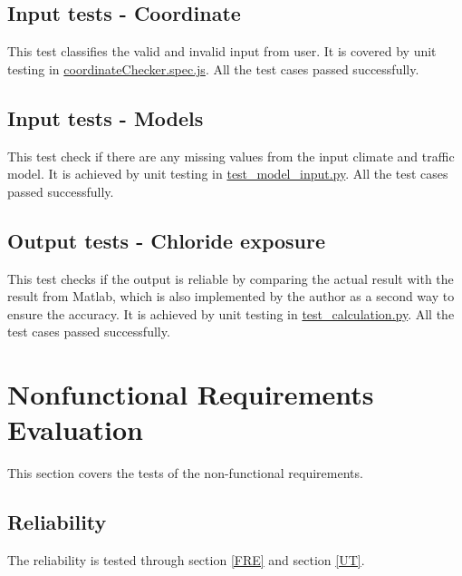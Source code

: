 \documentclass[12pt, titlepage]{article}
\begin{document}
\subsection{Input tests - Coordinate}
This test classifies the valid and invalid input from user. It is covered by unit testing in \href{https://github.com/smiths/BridgeChlorideExposurePredictor/blob/main/src/web/tests/unit/coordinateChecker.spec.js}{coordinateChecker.spec.js}. All the test cases passed successfully. 


\subsection{Input tests - Models}
This test check if there are any missing values from the input climate and traffic model. It is achieved by unit testing in  \href{https://github.com/smiths/BridgeChlorideExposurePredictor/blob/main/src/database/test_model_input.py}{test\_model\_input.py}. All the test cases passed successfully. 

\subsection{Output tests - Chloride exposure}
This test checks if the output is reliable by comparing the actual result with the result from Matlab, which is also implemented by the author as a second way to ensure the accuracy. It is achieved by unit testing in  \href{https://github.com/smiths/BridgeChlorideExposurePredictor/blob/main/src/database/test_calculation.py}{test\_calculation.py}. All the test cases passed successfully. 

\section{Nonfunctional Requirements Evaluation}
This section covers the tests of the non-functional requirements. 
\subsection{Reliability}
The reliability is tested through section \ref{FRE} and section \ref{UT}.
\end{document}
